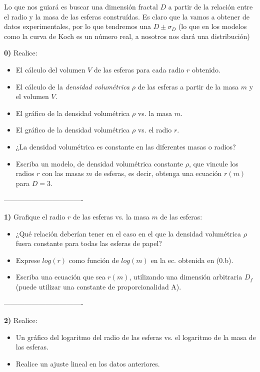 \documentclass[10pt,a4paper]{article}
\numberwithin{equation}{section}
\begin{document}
Lo que nos guiará es buscar una dimensión fractal $D$ a partir de la relación entre el radio y la masa de las esferas construídas. Es claro que la vamos a obtener de datos experimentales, por lo que tendremos una $D \pm \sigma_D$ (lo que en los modelos como la curva de Koch es un número real, a nosotros nos dará una distribución)


\noindent \textbf{0)}  Realice:
\begin{itemize}
\item[$\bullet$] El cálculo del volumen $V$ de las esferas para cada radio $r$ obtenido.
\item[$\bullet$] El cálculo de la \textit{densidad volumétrica} $\rho$ de las esferas a partir de la masa $m$ y el volumen $V$.
\item[$\bullet$] El gráfico de la densidad volumétrica $\rho$ vs. la masa $m$. 
\item[$\bullet$] El gráfico de la densidad volumétrica $\rho$ vs. el radio $r$. 
\end{itemize}

\begin{itemize}
\item[a)] ¿La densidad volumétrica es constante en las diferentes masas o radios?
\item[b)] Escriba un modelo, de densidad volumétrica constante $\rho$, que vincule los radios $r$ con las masas $m$ de esferas, es decir, obtenga una ecuación $r(m)$ para $D = 3$.
\end{itemize}

\-----------------------------------

\noindent \textbf{1)} Grafique el radio $r$ de las esferas vs. la masa $m$ de las esferas:

\begin{itemize}
\item[a)] ¿Qué relación deberían tener en el caso en el que la densidad volumétrica $\rho$ fuera constante para todas las esferas de papel?
\item[b)] Exprese $log(r)$ como función de $log(m)$ en la ec. obtenida en (0.b).
\item[c)] Escriba una ecuación que sea $r(m)$, utilizando una dimensión arbitraria $D_f$ (puede utilizar una constante de proporcionalidad A).
\end{itemize}


\-----------------------------------

\noindent \textbf{2)} Realice:

\begin{itemize}
\item[$\bullet$] Un gráfico del logaritmo del radio de las esferas vs. el logaritmo de la masa de las esferas. 
\item[$\bullet$] Realice un ajuste lineal en los datos anteriores.
\end{itemize} 
\end{document}
